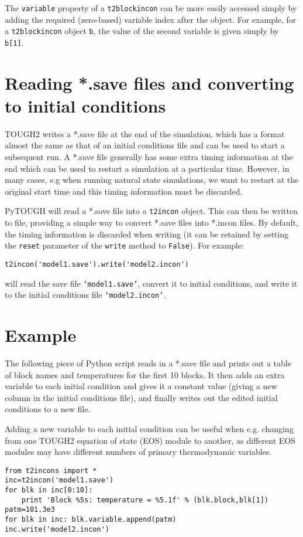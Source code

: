 The \texttt{variable} property of a \texttt{t2blockincon} can be more easily accessed simply by adding the required (zero-based) variable index after the object.  For example, for a \texttt{t2blockincon} object \texttt{b}, the value of the second variable is given simply by \texttt{b[1]}.

\section{Reading *.save files and converting to initial conditions}

TOUGH2 writes a *.save file at the end of the simulation, which has a format almost the same as that of an initial conditions file and can be used to start a subsequent run.  A *.save file generally has some extra timing information at the end which can be used to restart a simulation at a particular time.  However, in many cases, e.g when running natural state simulations, we want to restart at the original start time and this timing information must be discarded.

PyTOUGH will read a *.save file into a \texttt{t2incon} object.  This can then be written to file, providing a simple way to convert *.save files into *.incon files.  By default, the timing information is discarded when writing (it can be retained by setting the \texttt{reset} parameter of the \texttt{write} method to \texttt{False}).  For example:

\begin{verbatim}
t2incon('model1.save').write('model2.incon')
\end{verbatim}

will read the save file \texttt{`model1.save'}, convert it to initial conditions, and write it to the initial conditions file \texttt{`model2.incon'}.

\section{Example}

The following piece of Python script reads in a *.save file and prints out a table of block names and temperatures for the first 10 blocks.  It then adds an extra variable to each initial condition and gives it a constant value (giving a new column in the initial conditions file), and finally writes out the edited initial conditions to a new file.

Adding a new variable to each initial condition can be useful when e.g. changing from one TOUGH2 equation of state (EOS) module to another, as different EOS modules may have different numbers of primary thermodynamic variables.

\begin{verbatim}
from t2incons import *
inc=t2incon('model1.save')
for blk in inc[0:10]:
    print 'Block %5s: temperature = %5.1f' % (blk.block,blk[1])
patm=101.3e3
for blk in inc: blk.variable.append(patm)
inc.write('model2.incon')

\end{verbatim}

